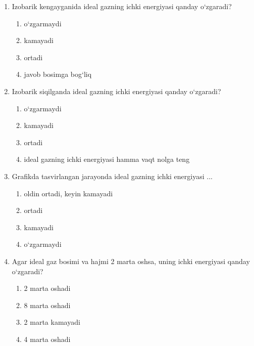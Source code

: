 \begin{enumerate}
\item Izobarik kengayganida ideal gazning ichki energiyasi qanday o‘zgaradi?
\begin{enumerate}[label=\Alph*)]
\item o‘zgarmaydi
\item kamayadi
\item ortadi
\item javob bosimga bog‘liq

\end{enumerate}

\item Izobarik siqilganda ideal gazning ichki energiyasi qanday o‘zgaradi?
\begin{enumerate}[label=\Alph*)]
\item o‘zgarmaydi
\item kamayadi
\item ortadi
\item ideal gazning ichki energiyasi hamma vaqt nolga teng

\end{enumerate}

\item Grafikda tasvirlangan jarayonda ideal gazning ichki energiyasi ...


\begin{enumerate}[label=\Alph*)]
\item oldin ortadi, keyin kamayadi
\item ortadi
\item kamayadi
\item o‘zgarmaydi

\end{enumerate}


\item Agar ideal gaz bosimi va hajmi 2 marta oshsa, uning ichki energiyasi qanday o‘zgaradi?
\begin{enumerate}[label=\Alph*)]
\item 2 marta oshadi
\item 8 marta oshadi
\item 2 marta kamayadi
\item 4 marta oshadi
\end{enumerate}


\end{enumerate}
